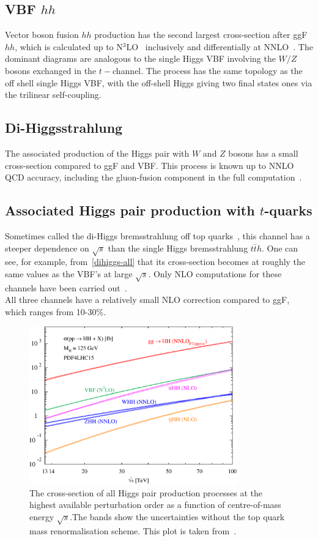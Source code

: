 \subsection{VBF $hh$}
Vector boson fusion $hh$ production has the second largest cross-section after ggF $hh$, which is calculated up to N$^3$LO~\cite{Baglio:2012np,Ling:2014sne,Dreyer:2018qbw} inclusively and differentially at NNLO~\cite{Dreyer:2018rfu}. The dominant diagrams are analogous to the single Higgs VBF involving the $W/Z$ bosons exchanged in the $t-$channel. The process has the same topology as the off shell single Higgs VBF, with the off-shell Higgs giving two final states ones via the trilinear self-coupling. 
\subsection{Di-Higgsstrahlung}
The associated production of the Higgs pair with $W$ and $Z$ bosons has a small cross-section compared to ggF and VBF. This process is known up to NNLO QCD accuracy, including the gluon-fusion component in the full computation~\cite{Baglio:2012np,Li:2016nrr, Li:2017lbf}. 
\subsection{Associated Higgs pair production with $t$-quarks}
Sometimes called the di-Higgs bremsstrahlung off top quarks~\cite{DiMicco:2019ngk}, this channel has a steeper dependence on $\sqrt{s}$ than the single Higgs bremsstrahlung $t\bar t h$. One can see, for example, from~\autoref{dihiggs-all} that its cross-section becomes at roughly the same values as the VBF's at large $\sqrt{s}$. Only NLO computations for these channels have been carried out~\cite{Frederix:2014hta}. \\ All three channels have a relatively small NLO correction compared to ggF, which ranges from 10-30\%. 
\begin{figure}[!htpb]
	\centering
	\includegraphics[width = 0.8\textwidth]{./figures/cxn_HH}
	\caption{The cross-section of all Higgs pair production processes at the highest available perturbation order as a function of centre-of-mass energy $\sqrt{s}$.The bands show the uncertainties without the top quark mass renormalisation scheme. This plot is taken from~\cite{DiMicco:2019ngk}.} 
	\label{dihiggs-all}
\end{figure}
%

